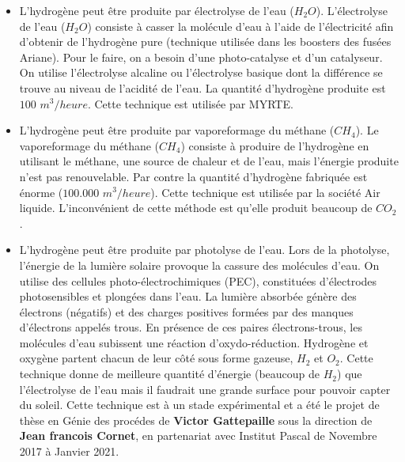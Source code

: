  \begin{itemize}[label=$\square$]
 	\item L'hydrogène peut être produite par électrolyse de l'eau ($H_2O$). L'électrolyse de l'eau ($H_2O$) consiste à casser la molécule d'eau à l'aide de l'électricité afin d'obtenir de l'hydrogène pure (technique utilisée dans les boosters des fusées Ariane). Pour le faire, on a besoin d'une photo-catalyse et d'un catalyseur. On utilise l'électrolyse alcaline ou l'électrolyse basique dont la différence se trouve au niveau de l'acidité de l'eau. La quantité d'hydrogène produite est $100$ $ m^3/heure$. Cette technique est utilisée par MYRTE.
 	\item L'hydrogène peut être produite par vaporeformage du méthane ($CH_4$). Le vaporeformage du méthane ($CH_4$) consiste à produire de l'hydrogène en utilisant le méthane, une source de chaleur et de l'eau, mais l'énergie produite n'est pas renouvelable. Par contre la quantité d'hydrogène fabriquée est énorme ($100.000 $ $ m^3/heure$). Cette technique est utilisée par la société Air liquide. L'inconvénient de cette méthode est qu'elle produit beaucoup de $CO_2$.
 
 	\item L'hydrogène peut être produite par photolyse de l'eau. Lors de la photolyse, l'énergie de la lumière solaire provoque la cassure des molécules d'eau. On utilise des cellules photo-électrochimiques (PEC), constituées d'électrodes photosensibles et plongées dans l'eau. La lumière absorbée génère des électrons (négatifs) et des charges positives formées par des manques d'électrons appelés trous. En présence de ces paires électrons-trous, les molécules d'eau subissent une réaction d'oxydo-réduction. Hydrogène et oxygène partent chacun de leur côté sous forme gazeuse, $H_2$ et $O_2$. Cette technique donne de meilleure quantité d'énergie (beaucoup de $H_2$) que l'électrolyse de l'eau mais il faudrait une grande surface pour pouvoir capter du soleil. Cette technique est à un stade expérimental et a été le projet de thèse en Génie des procédes de \textbf{Victor Gattepaille} sous la direction de \textbf{Jean francois Cornet}, en partenariat avec Institut Pascal de Novembre 2017 à Janvier 2021.
 \end{itemize}
 
